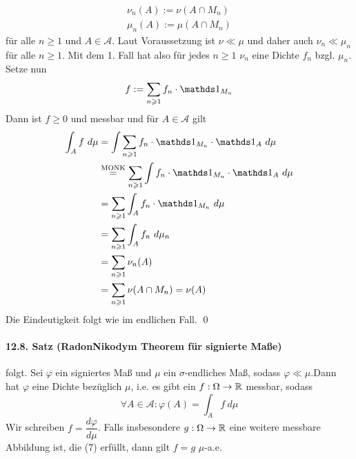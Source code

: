      \begin{gather*}
         \nu_n(A):=\nu(A\cap M_n) \\
         \mu_n(A):=\mu(A\cap M_n)
     \end{gather*}
     f\"ur alle $n\geq1$ und $A\in\mathcal{A}$. Laut Voraussetzung ist $\nu\ll\mu$ und daher auch $\nu_n\ll\mu_n$ f\"ur alle $n\geq1$. Mit dem 1. Fall hat also f\"ur jedes $n\geq1$ $\nu_n$ eine Dichte $f_n$ bzgl. $\mu_n$. Setze nun 
     $$f:=\sum_{n\geq1}f_n\cdot\ind{M_n}$$
     Dann ist $f\geq0$ und messbar und f\"ur $A\in\mathcal{A}$ gilt
     \begin{align*}
         \int_A f\ d\mu&=\int\sum_{n\geq1}f_n\cdot\ind{M_n}\cdot\ind{A}\ d\mu\\
         &\overset{\text{MONK}}{=}\sum_{n\geq1}\int f_n\cdot\ind{M_n}\cdot\ind{A}\ d\mu \\
         &=\sum_{n\geq1}\int_A f_n\cdot\ind{M_n}\ d\mu \\
         &=\sum_{n\geq1}\int_A f_n\ d\mu_n\\
         &=\sum_{n\geq1}\nu_n(A)\\
         &=\sum_{n\geq1}\nu(A\cap M_n)=\nu(A)
     \end{align*}
     Die Eindeutigkeit folgt wie im endlichen Fall. \qed
     
     \paragraph{12.8. Satz (Radon\textendash Nikodym Theorem f\"ur signierte Ma\ss{}e)} folgt.
     Sei $\varphi$ ein signiertes Maß und $\mu$ ein $\sigma$-endliches Maß, sodass $\varphi\ll\mu$.Dann hat $\varphi$ eine Dichte bez\"uglich $\mu$, i.e. es gibt ein $f:\Omega\to\mathbb{R}$ messbar, sodass
     \begin{equation*}
         \forall A\in\mathcal{A}: \varphi(A)=\int_A f \ d\mu
     \end{equation*}
     Wir schreiben $f=\dfrac{d\varphi}{d\mu}$. Falls insbesondere $g:\Omega\to\mathbb{R}$ eine weitere messbare Abbildung ist, die (7) erf\"ullt, dann gilt $f=g$ $\mu$-a.e.
     
